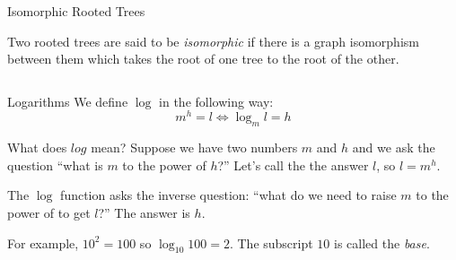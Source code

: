 \begin{frame}[fragile]{Isomorphic Rooted Trees}
  \begin{definition}
   Two rooted trees are said to be \emph{isomorphic} if there is a graph isomorphism between them which takes the root of one tree to the root of the other.
  \end{definition}
  \vspace{5mm}
  \begin{columns}
    \begin{column}{0.4\textwidth}
      \begin{center}
      \end{center}
    \end{column}
    \begin{column}{0.4\textwidth}
      \begin{center}
      \end{center}
    \end{column}
  \end{columns}
\end{frame}

\begin{frame}{Logarithms}
  We define $\log$ in the following way:
  \[ m^h = l \Leftrightarrow \log_m l = h \]

  \begin{alertblock}{What does $log$ mean?}
    Suppose we have two numbers $m$ and $h$ and we ask the question ``what is $m$ to the power of $h$?''
    Let's call the the answer $l$, so $l = m^h$.

    The $\log$ function asks the inverse question: ``what do we need to raise $m$ to the power of to get $l$?''
    The answer is $h$.

    For example, $10^2 = 100$ so $\log_{10} 100 = 2$.
    The subscript $10$ is called the \emph{base}.
  \end{alertblock}
\end{frame}

